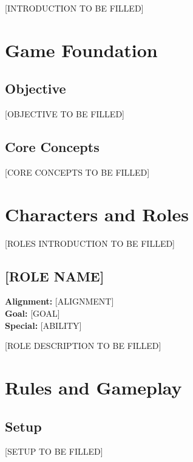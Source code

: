 \documentclass[12pt,a4paper,onecolumn,titlepage]{nierAutomata}
\begin{document}
[INTRODUCTION TO BE FILLED]

\section{Game Foundation}

\subsection{Objective}
[OBJECTIVE TO BE FILLED]

\subsection{Core Concepts}
[CORE CONCEPTS TO BE FILLED]

\begin{center}
\begin{nierbox}[title=Key Concepts]
\end{nierbox}
\end{center}

\section{Characters and Roles}

[ROLES INTRODUCTION TO BE FILLED]

\subsection{[ROLE NAME]}
\begin{center}
\begin{nierbox}[title=Role Summary]
    \textbf{Alignment:} [ALIGNMENT] \\
    \textbf{Goal:} [GOAL] \\
    \textbf{Special:} [ABILITY]
\end{nierbox}
\end{center}

[ROLE DESCRIPTION TO BE FILLED]

\section{Rules and Gameplay}

\subsection{Setup}
[SETUP TO BE FILLED]
\end{document}
